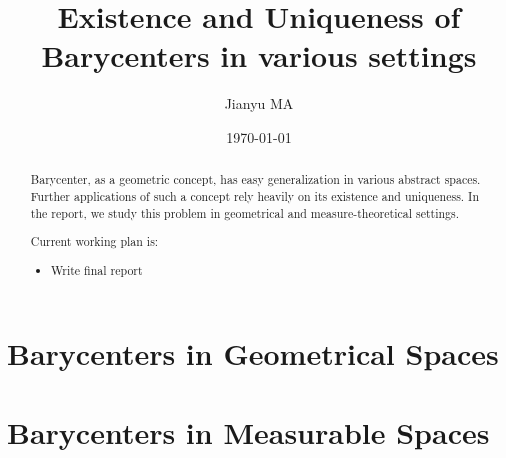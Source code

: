 \documentclass{report}
\title{Existence and Uniqueness of Barycenters in various settings}
\author{Jianyu MA}
\date{\today}
\theoremstyle{remark}
\theoremstyle{definition}
\begin{document}
\maketitle

\begin{abstract}
	Barycenter, as a geometric concept, has easy generalization in various abstract spaces. Further applications of such a concept rely heavily on its existence and uniqueness. In the report, we study this problem in geometrical and measure-theoretical settings.

	Current working plan is:
	\begin{itemize}
		\item Write final report
	\end{itemize}
\end{abstract}

\tableofcontents
{}


\part{Barycenters in Geometrical Spaces}





\part{Barycenters in Measurable Spaces}







\printbibliography
\end{document}
